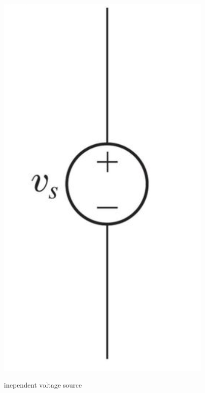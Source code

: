 \documentclass[nobib]{tufte-handout}
\begin{document}
\begin{itemize}
\begin{marginfigure}
        \includegraphics[width=\textwidth/2]{images/independentvoltagesource.png}
        \caption{inependent voltage source}
        \label{fig:independentvoltagesource}
    \end{marginfigure} 


\end{itemize}
\end{document}
